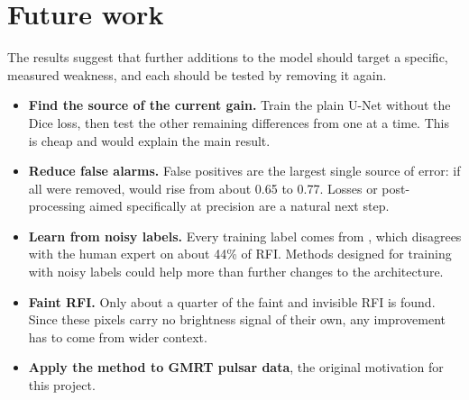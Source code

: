 \section{Future work}
The results suggest that further additions to the model should target a
specific, measured weakness, and each should be tested by removing it again.
\begin{itemize}
  \item \textbf{Find the source of the current gain.} Train the plain U-Net
    without the Dice loss, then test the other remaining differences from
    \tfunet{} one at a time. This is cheap and would explain the main result.
  \item \textbf{Reduce false alarms.} False positives are the largest single
    source of error: if all were removed, \Fone{} would rise from about 0.65 to
    0.77. Losses or post-processing aimed specifically at precision are a
    natural next step.
  \item \textbf{Learn from noisy labels.} Every training label comes from
    \aoflagger{}, which disagrees with the human expert on about 44\% of RFI.
    Methods designed for training with noisy labels could help more than
    further changes to the architecture.
  \item \textbf{Faint RFI.} Only about a quarter of the faint and invisible RFI
    is found. Since these pixels carry no brightness signal of their own, any
    improvement has to come from wider context.
  \item \textbf{Apply the method to GMRT pulsar data}, the original motivation
    for this project.
\end{itemize}
